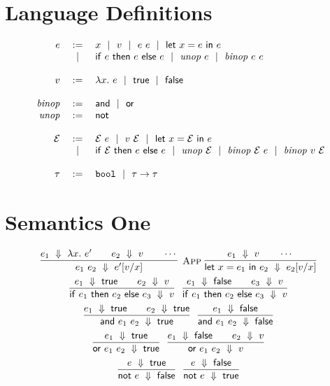 \documentclass[10pt]{article}
\begin{document}
\section{Language Definitions}

\[
  \begin{array}{rcl}
  e  &:=& x \alt v \alt e~e \alt \letdefe{x}{e}{e}\\
     &\alt& \ife{e}{e}{e} \alt \unope{e} \alt \binope{e}{e}\\
  \\ %
  v  &:=& \lamdefe{x}{e} \alt \truev \alt \falsev\\
  \\
  \binopdef &:=& \andop \alt \orop\\
  \unopdef  &:=& \notop \\
  \\
  \Ctxt &:=& \Ctxt~e \alt v~\Ctxt \alt \letdefe{x}{\Ctxt}{e}\\
  &\alt& \ife{\Ctxt}{e}{e} \alt \unope{\Ctxt} \alt \binope{\Ctxt}{e} \alt \binope{v}{\Ctxt}\\
  \\
  \tau  &:=& \boolt \alt \funct{\tau}{\tau}\\
  \end{array}
\]

\section{Semantics One}

\begin{gather*}
\infr[App]
  {\dstep{e_1}{\lamdefe{x}{e'}} \iand \dstep{e_2}{v} \iand \cdots}
  {\dstep{e_1~e_2}{\subst{x}{v}{e'}}}
~
\infr
  {\dstep{e_1}{v} \iand \cdots}
  {\dstep{\letdefe{x}{e_1}{e_2}}{\subst{x}{v}{e_2}}}
\\
\infr
  {\dstep{e_1}{\truev} \iand \dstep{e_2}{v}}
  {\dstep{\ife{e_1}{e_2}{e_3}}{v}}
~
\infr
  {\dstep{e_1}{\falsev} \iand \dstep{e_3}{v}}
  {\dstep{\ife{e_1}{e_2}{e_3}}{v}}
\\
\infr
  {\dstep{e_1}{\truev} \iand \dstep{e_2}{\truev}}
  {\dstep{\ande{e_1}{e_2}}{\truev}}
~
\infr
  {\dstep{e_1}{\falsev}}
  {\dstep{\ande{e_1}{e_2}}{\falsev}}
\\
\infr
  {\dstep{e_1}{\truev}}
  {\dstep{\ore{e_1}{e_2}}{\truev}}
~
\infr
  {\dstep{e_1}{\falsev} \iand \dstep{e_2}{v}}
  {\dstep{\ore{e_1}{e_2}}{v}}
\\
\infr
  {\dstep{e}{\truev}}
  {\dstep{\note{e}}{\falsev}}
~
\infr
  {\dstep{e}{\falsev}}     
  {\dstep{\note{e}}{\truev}}
\end{gather*}
\end{document}
